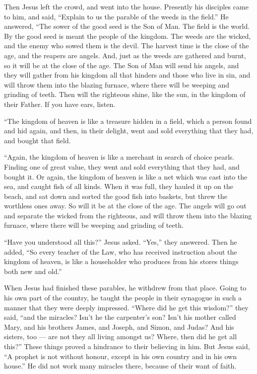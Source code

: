  Then Jesus left the crowd, and went into the house.
Presently his disciples came to him, and said, ``Explain to us the
parable of the weeds in the field.''  He answered, ``The
sower of the good seed is the Son of Man.  The field is the
world. By the good seed is meant the people of the kingdom. The weeds
are the wicked,  and the enemy who sowed them is the devil.
The harvest time is the close of the age, and the reapers are angels.
 And, just as the weeds are gathered and burnt, so it will
be at the close of the age.  The Son of Man will send his
angels, and they will gather from his kingdom all that hinders and those
who live in sin,  and will throw them into the blazing
furnace, where there will be weeping and grinding of teeth.
 Then will the righteous shine, like the sun, in the
kingdom of their Father. If you have ears, listen.

 ``The kingdom of heaven is like a treasure hidden in a
field, which a person found and hid again, and then, in their delight,
went and sold everything that they had, and bought that field.

 ``Again, the kingdom of heaven is like a merchant in
search of choice pearls.  Finding one of great value, they
went and sold everything that they had, and bought it.  Or
again, the kingdom of heaven is like a net which was cast into the sea,
and caught fish of all kinds.  When it was full, they
hauled it up on the beach, and sat down and sorted the good fish into
baskets, but threw the worthless ones away.  So will it be
at the close of the age. The angels will go out and separate the wicked
from the righteous,  and will throw them into the blazing
furnace, where there will be weeping and grinding of teeth.

 ``Have you understood all this?'' Jesus asked. ``Yes,''
they answered.  Then he added, ``So every teacher of the
Law, who has received instruction about the kingdom of heaven, is like a
householder who produces from his stores things both new and old.''

 When Jesus had finished these parables, he withdrew from
that place.  Going to his own part of the country, he
taught the people in their synagogue in such a manner that they were
deeply impressed. ``Where did he get this wisdom?'' they said, ``and the
miracles?  Isn't he the carpenter's son? Isn't his mother
called Mary, and his brothers James, and Joseph, and Simon, and Judas?
 And his sisters, too --- are not they all living amongst
us? Where, then did he get all this?''  These things proved
a hindrance to their believing in him. But Jesus said, ``A prophet is
not without honour, except in his own country and in his own house.''
 He did not work many miracles there, because of their want
of faith.

